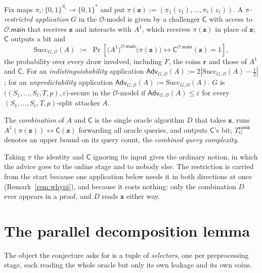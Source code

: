 \documentclass{conjura-conjecture}
\newcommand{\Adv}{\mathsf{Adv}}
\newcommand{\Succ}{\mathrm{Succ}}
\newcommand{\Prob}[1]{\Pr\!\left[#1\right]}
\newcommand{\bits}{\{0,1\}}
\newcommand{\vz}{\mathbf{z}}
\newcommand{\vr}{\mathbf{r}}
\newcommand{\main}{\mathsf{main}}
\newcommand{\Tcomb}{T^{\mathsf{comb}}_{G}}
\begin{document}
\begin{definition}
\label{def:app}
Fix maps $\pi_i : \bits^{S_i} \to \bits^{*}$ and put
$\pi(\vz) := (\pi_1(z_1),\dots,\pi_\ell(z_\ell))$. A
\emph{$\pi$-restricted application} $G$ in the $\mathcal{O}$-model is
given by a challenger $\mathsf{C}$ with access to $\mathcal{O}.\main$ that
receives $\vz$ and interacts with $A^{1}$, which receives $\pi(\vz)$ in
place of $\vz$; $\mathsf{C}$ outputs a bit and
\[
  \Succ_{G,\mathcal{O}}(A) \;:=\;
  \Prob{\bigl(A^{1}\bigr)^{\mathcal{O}.\main}\!\bigl(\pi(\vz)\bigr)
  \leftrightarrow \mathsf{C}^{\mathcal{O}.\main}(\vz) = 1} ,
\]
the probability over every draw involved, including $F$, the coins $\vr$
and those of $A^{1}$ and $\mathsf{C}$. For an
\emph{indistinguishability} application $\Adv_{G,\mathcal{O}}(A) :=
2|\Succ_{G,\mathcal{O}}(A) - \tfrac12|$; for an \emph{unpredictability}
application $\Adv_{G,\mathcal{O}}(A) := \Succ_{G,\mathcal{O}}(A)$. $G$ is
$\bigl((S_1,\dots,S_\ell,T,p),\varepsilon\bigr)$-secure in the
$\mathcal{O}$-model if $\Adv_{G,\mathcal{O}}(A) \le \varepsilon$ for every
$(S_1,\dots,S_\ell,T,p)$-split attacker $A$.

The \emph{combination} of $A$ and $\mathsf{C}$ is the single oracle
algorithm $D$ that takes $\vz$, runs $A^{1}(\pi(\vz)) \leftrightarrow
\mathsf{C}(\vz)$ forwarding all oracle queries, and outputs $\mathsf{C}$'s
bit; $\Tcomb$ denotes an upper bound on its query count, the
\emph{combined query complexity}.

Taking $\pi$ the identity and $\mathsf{C}$ ignoring its input gives the
ordinary notion, in which the advice goes to the online stage and to
nobody else. The restriction is carried from the start because one
application below needs it in both directions at once
(Remark~\ref{rem:whypi}), and because it costs nothing: only the
combination $D$ ever appears in a proof, and $D$ reads $\vz$ either way.
\end{definition}

\section{The parallel decomposition lemma}\label{sec:lemma}

The object the conjecture asks for is a tuple of \emph{selectors}, one per
preprocessing stage, each reading the whole oracle but only its own
leakage and its own coins.
\end{document}
